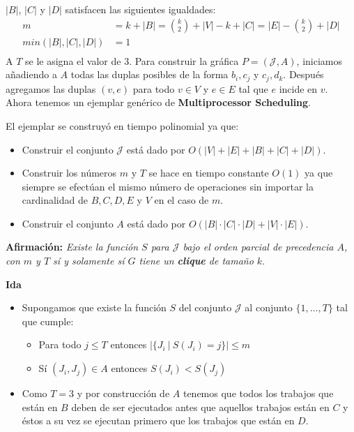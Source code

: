 \documentclass[spanish, xcolor=dvipsnames, aspectratio=169]{beamer}
\newcommand{\subsectiontitle}{}
\begin{document}
\begin{frame}{\subsectiontitle}
\(|B|\), \(|C|\) y \(|D|\) satisfacen las siguientes igualdades:
\begin{align*}
    m &= k + |B| = \binom{k}{2} + |V| - k + |C| = |E| - \binom{k}{2} + |D| \\
    min\left(|B|, |C|, |D|\right) &= 1 \\
\end{align*}
A \(T\) se le asigna el valor de \(3\).
\newline 
Para construir la gráfica \(P = \left(\mathcal{J}, A\right) \), iniciamos añadiendo a \(A\) todas las duplas posibles
de la forma \(b_{i}, c_{j}\) y \(c_{j}, d_{k}\). Después agregamos las duplas \(\left(v, e\right)\) para todo 
\(v \in V\) y \(e \in E\) tal que \(e\) incide en \(v\). Ahora tenemos un ejemplar genérico de \textbf{Multiprocessor Scheduling}.
\newline 
\end{frame}
\begin{frame}{\subsectiontitle}
El ejemplar se construyó en tiempo polinomial ya que:
\begin{itemize}
    \item Construir el conjunto \(\mathcal{J}\) está dado por \(O\left(|V| + |E| + |B| + |C| + |D|\right)\).
    \item Construir los números \(m\) y \(T\) se hace en tiempo constante \(O\left(1\right)\) ya que siempre se efectúan el mismo número 
          de operaciones sin importar la cardinalidad de \(B, C, D, E\) y \(V\) en el caso de \(m\).
    \item Construir el conjunto \(A\) está dado por \(O\left(|B| \cdot |C| \cdot |D| + |V| \cdot |E|\right)\).
\end{itemize}
\end{frame}
\begin{frame}{\subsectiontitle}
    \textbf{Afirmación:}
    \newline 
    \textit{Existe la función \(S\) para \(\mathcal{J}\) bajo el orden parcial de precedencia \(A\), con \(m\) y \(T\)
    sí y solamente sí \(G\) tiene un \textbf{clique} de tamaño \(k\)}.
\end{frame}
\begin{frame}{\subsectiontitle}
\textbf{Ida}
\begin{itemize}
    \item Supongamos que existe la función \(S\) del conjunto \(\mathcal{J}\) al conjunto \(\{1, \dotsc, T\}\) tal que cumple:
    \begin{itemize}
        \item Para todo \(j \leq T \) entonces \(|\{J_{i} \ | \ S\left(J_{i}\right) = j\}| \leq m\)
        \item Sí \(\left(J_{i}, J_{j}\right) \in A\) entonces \(S\left(J_{i}\right) < S\left(J_{j}\right)\)
    \end{itemize}
    \item Como \(T = 3\) y por construcción de \(A\) tenemos que todos los trabajos que están en \(B\) deben de ser ejecutados 
    antes que aquellos trabajos están en \(C\) y éstos a su vez se ejecutan primero que los trabajos que están en \(D\).
\end{itemize}
\end{frame}
\end{document}

